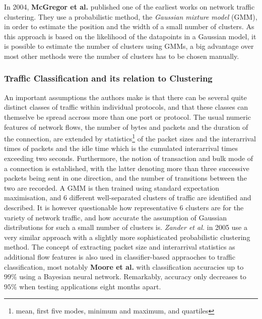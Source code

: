 \documentclass[a4paper,12pt,twoside]{report}
\begin{document}
In 2004, \textbf{McGregor et al.} \cite{mcgregor2004flow} published one of the earliest works on network traffic clustering. They use a probabilistic method, the \textit{Gaussian mixture model} (GMM), in order to estimate the position and the width of a small number of clusters. As this approach is based on the likelihood of the datapoints in a Gaussian model, it is possible to estimate the number of clusters using GMMs, a big advantage over most other methods were the number of clusters has to be chosen manually. 

\subsubsection*{Traffic Classification and its relation to Clustering}

An important assumptions the authors make is that there can be several quite distinct classes of traffic within individual protocols, and that these classes can themselve be spread accross more than one port or protocol. The usual numeric features of network flows, the number of bytes and packets and the duration of the connection, are extended by statistics\footnote{mean, first five modes, minimum and maximum, and quartiles} of the packet sizes and the interarrival times of packets and the idle time which is the cumulated interarrival times exceeding two seconds. Furthermore, the notion of transaction and bulk mode of a connection is established, with the latter denoting more than three successive packets being sent in one direction, and the number of transitions between the two are recorded. A GMM is then trained using standard expectation maximisation, and 6 different well-separated clusters of traffic are identified and described. It is however questionable how representative 6 clusters are for the variety of network traffic, and how accurate the assumption of Gaussian distributions for such a small number of clusters is. \textit{Zander et al.} \cite{zander2005automated} in 2005 use a very similar approach with a slightly more sophisticated probabilistic clustering method. The concept of extracting packet size and interarrival statistics as additional flow features is also used in classifier-based appraoches to traffic classification, most notably \textbf{Moore et al.} \cite{auld2007bayesian,moore2005internet} with classification accuracies up to $99\%$ using a Bayesian neural network. Remarkably, accuracy only decreases to $95\%$ when testing applications eight months apart.
\end{document}
